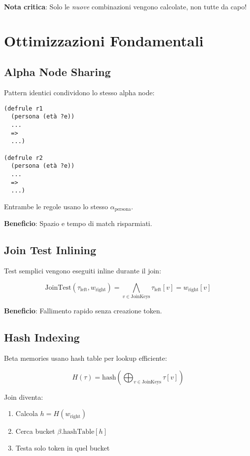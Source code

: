\textbf{Nota critica}: Solo le \textit{nuove} combinazioni vengono calcolate, non tutte da capo!

\section{Ottimizzazioni Fondamentali}

\subsection{Alpha Node Sharing}

Pattern identici condividono lo stesso alpha node:

\begin{lstlisting}[language=CLIPS]
(defrule r1
  (persona (età ?e))
  ...
  =>
  ...)

(defrule r2
  (persona (età ?e))
  ...
  =>
  ...)
\end{lstlisting}

Entrambe le regole usano lo stesso $\alpha_{\text{persona}}$.

\textbf{Beneficio}: Spazio e tempo di match risparmiati.

\subsection{Join Test Inlining}

Test semplici vengono eseguiti inline durante il join:

\begin{equation}
\text{JoinTest}(\tau_{\text{left}}, w_{\text{right}}) = \bigwedge_{v \in \text{JoinKeys}} \tau_{\text{left}}[v] = w_{\text{right}}[v]
\end{equation}

\textbf{Beneficio}: Fallimento rapido senza creazione token.

\subsection{Hash Indexing}

Beta memories usano hash table per lookup efficiente:

\begin{equation}
H(\tau) = \text{hash}\left(\bigoplus_{v \in \text{JoinKeys}} \tau[v]\right)
\end{equation}

Join diventa:
\begin{enumerate}
\item Calcola $h = H(w_{\text{right}})$
\item Cerca bucket $\beta.\text{hashTable}[h]$
\item Testa solo token in quel bucket
\end{enumerate}

